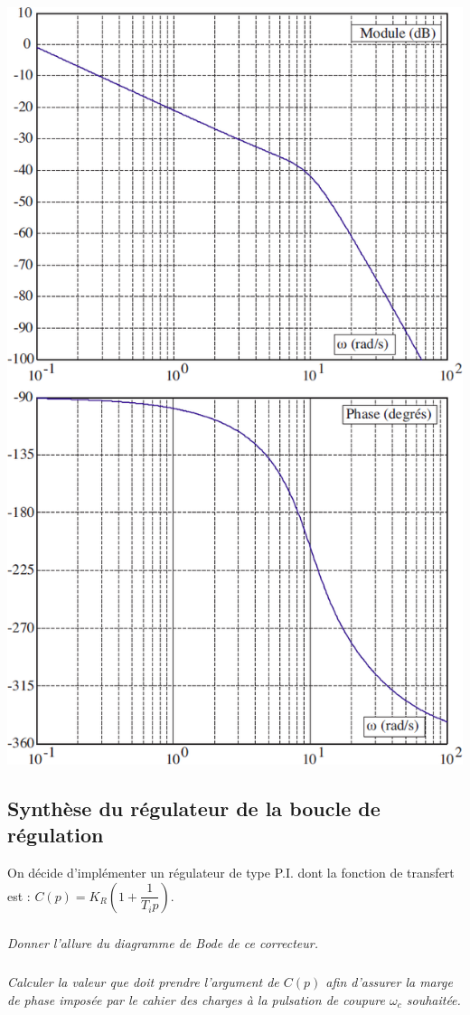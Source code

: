 \documentclass[10pt,fleqn]{article} %
\begin{document}
\begin{multicols}{2}
\begin{center}
\includegraphics[width=\linewidth]{images/fig_03}
\end{center}

\subsection*{Synthèse du régulateur de la boucle de régulation}
On décide d’implémenter un régulateur de type P.I. dont la fonction de transfert
est : $C(p)=K_R\left( 1+\dfrac{1}{T_i p}\right)$.

\subparagraph{}\textit{Donner l'allure du diagramme de Bode de ce correcteur.}
\subparagraph{}\textit{Calculer la valeur que doit prendre l’argument de $C(p)$ afin d’assurer
la marge de phase imposée par le cahier des charges à la pulsation de coupure $\omega_c$
souhaitée.}


\end{multicols}
\end{document}
